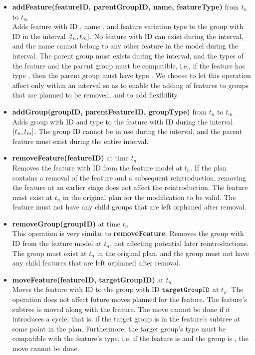 \begin{itemize}
  \item \textbf{addFeature(featureID, parentGroupID, name, featureType)} from $t_n$ to $t_m$\\
    Adds feature with ID , name , and feature variation type  to the group with ID  in the interval $\interval{t_n}{t_m}$. No feature with ID  can exist during the interval, and the name cannot belong to any other feature in the model during the interval. The parent group must exists during the interval, and the types of the feature and the parent group must be compatible, i.e., if the feature has type \mandatory{}, then the parent group must have type \andtype{}. We choose to let this operation affect only within an interval so as to enable the adding of features to groups that are planned to be removed, and to add flexibility.
  \item \textbf{addGroup(groupID, parentFeatureID, groupType)} from $t_n$ to $t_m$\\
    Adds group with ID  and type  to the feature with ID  during the interval $\interval{t_n}{t_m}$. The group ID cannot be in use during the interval, and the parent feature must exist during the entire interval. 
  \item \textbf{removeFeature(featureID)} at time $t_n$\\
    Removes the feature with ID  from the feature model at $t_n$. If the plan contains a removal of the feature and a subsequent reintroduction, removing the feature at an earlier stage does not affect the reintroduction. The feature must exist at $t_n$ in the original plan for the modification to be valid. The feature must not have any child groups that are left orphaned after removal. 
  \item \textbf{removeGroup(groupID)} at time $t_n$\\
    This operation is very similar to \textbf{removeFeature}. Removes the group with ID  from the feature model at $t_n$, not affecting potential later reintroductions. The group must exist at $t_n$ in the original plan, and the group must not have any child features that are left orphaned after removal. 
  \item \textbf{moveFeature(featureID, targetGroupID)} at $t_n$\\
    Moves the feature with ID  to the group with ID $\texttt{targetGroupID}$ at $t_n$. The operation does not affect future moves planned for the feature. The feature's subtree is moved along with the feature. The move cannot be done if it introduces a cycle; that is, if the target group is in the feature's subtree at some point in the plan. Furthermore, the target group's type must be compatible with the feature's type, i.e. if the feature is \mandatory{} and the group is \optional{}, the move cannot be done.

\end{itemize}
